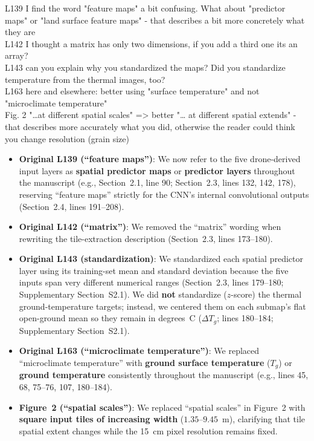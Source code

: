 \documentclass[12pt,english]{reviewresponse}
\begin{document}
\begin{revcomment}
L139 I find the word "feature maps" a bit confusing. What about "predictor maps" or "land surface feature maps" - that describes a bit more concretely what they are\\
L142 I thought a matrix has only two dimensions, if you add a third one its an array?\\
L143 can you explain why you standardized the maps? Did you standardize temperature from the thermal images, too?\\
L163 here and elsewhere: better using "surface temperature" and not "microclimate temperature"\\
Fig. 2 "…at different spatial scales" => better "… at different spatial extends" - that describes more accurately what you did, otherwise the reader could think you change resolution (grain size)
\end{revcomment}

\begin{revresponse}
\begin{itemize}[leftmargin=*, itemsep=0.2em]
    \item \textbf{Original L139 (``feature maps'')}: We now refer to the five drone-derived input layers as \textbf{spatial predictor maps} or \textbf{predictor layers} throughout the manuscript (e.g., Section~2.1, line 90; Section~2.3, lines 132, 142, 178), reserving ``feature maps'' strictly for the CNN's internal convolutional outputs (Section~2.4, lines 191--208).
    \item \textbf{Original L142 (``matrix'')}: We removed the ``matrix'' wording when rewriting the tile-extraction description (Section~2.3, lines 173--180).
    \item \textbf{Original L143 (standardization)}: We standardized each spatial predictor layer using its training-set mean and standard deviation because the five inputs span very different numerical ranges (Section~2.3, lines 179--180; Supplementary Section~S2.1). We did \textbf{not} standardize ($z$-score) the thermal ground-temperature targets; instead, we centered them on each submap's flat open-ground mean so they remain in degrees~C ($\Delta T_g$; lines 180--184; Supplementary Section~S2.1).
    \item \textbf{Original L163 (``microclimate temperature'')}: We replaced ``microclimate temperature'' with \textbf{ground surface temperature} ($T_g$) or \textbf{ground temperature} consistently throughout the manuscript (e.g., lines 45, 68, 75--76, 107, 180--184).
    \item \textbf{Figure~2 (``spatial scales'')}: We replaced ``spatial scales'' in Figure~2 with \textbf{square input tiles of increasing width} ($1.35\text{--}9.45$~m), clarifying that tile spatial extent changes while the 15~cm pixel resolution remains fixed.
\end{itemize}
\end{revresponse}
\end{document}
